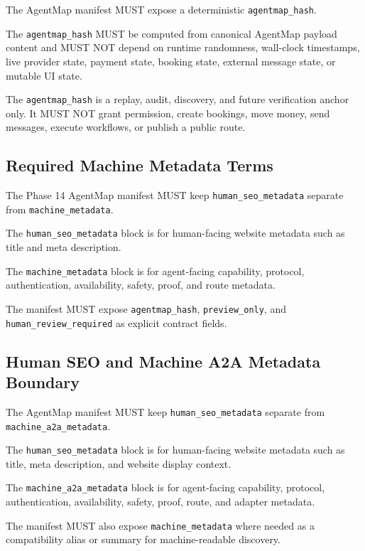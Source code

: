 The AgentMap manifest MUST expose a deterministic \texttt{agentmap_hash}.

The \texttt{agentmap_hash} MUST be computed from canonical AgentMap payload content and MUST NOT depend on runtime randomness, wall-clock timestamps, live provider state, payment state, booking state, external message state, or mutable UI state.

The \texttt{agentmap_hash} is a replay, audit, discovery, and future verification anchor only. It MUST NOT grant permission, create bookings, move money, send messages, execute workflows, or publish a public route.



\subsection{Required Machine Metadata Terms}

The Phase 14 AgentMap manifest MUST keep \texttt{human_seo_metadata} separate from \texttt{machine_metadata}.

The \texttt{human_seo_metadata} block is for human-facing website metadata such as title and meta description.

The \texttt{machine_metadata} block is for agent-facing capability, protocol, authentication, availability, safety, proof, and route metadata.

The manifest MUST expose \texttt{agentmap_hash}, \texttt{preview_only}, and \texttt{human_review_required} as explicit contract fields.



\subsection{Human SEO and Machine A2A Metadata Boundary}

The AgentMap manifest MUST keep \texttt{human_seo_metadata} separate from \texttt{machine_a2a_metadata}.

The \texttt{human_seo_metadata} block is for human-facing website metadata such as title, meta description, and website display context.

The \texttt{machine_a2a_metadata} block is for agent-facing capability, protocol, authentication, availability, safety, proof, route, and adapter metadata.

The manifest MUST also expose \texttt{machine_metadata} where needed as a compatibility alias or summary for machine-readable discovery.

